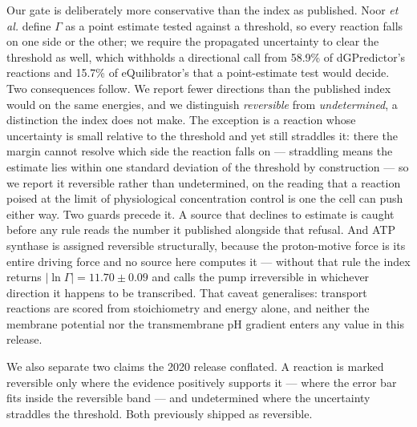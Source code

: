 Our gate is deliberately more conservative than the index as published. Noor
\textit{et al.} define $\Gamma$ as a point estimate tested against a threshold,
so every reaction falls on one side or the other; we require the propagated
uncertainty to clear the threshold as well, which withholds a directional call
from 58.9\% of dGPredictor's reactions and 15.7\% of eQuilibrator's that a
point-estimate test would decide. Two consequences follow. We report fewer
directions than the published index would on the same energies, and we
distinguish \emph{reversible} from \emph{undetermined}, a distinction the index
does not make. The exception is a reaction whose uncertainty is small relative
to the threshold and yet still straddles it: there the margin cannot resolve
which side the reaction falls on --- straddling means the estimate lies within
one standard deviation of the threshold by construction --- so we report it
reversible rather than undetermined, on the reading that a reaction poised at
the limit of physiological concentration control is one the cell can push either
way. Two guards precede it. A source that
declines to estimate is caught before any rule reads the number it published
alongside that refusal. And ATP synthase is assigned reversible structurally,
because the proton-motive force is its entire driving force and no source here
computes it --- without that rule the index returns $|\ln\Gamma| = 11.70 \pm
0.09$ and calls the pump irreversible in whichever direction it happens to be
transcribed. That caveat generalises: transport reactions are scored from
stoichiometry and energy alone, and neither the membrane potential nor the
transmembrane pH gradient enters any value in this release.

We also separate two claims the 2020 release conflated. A reaction is marked
reversible only where the evidence positively supports it --- where the error
bar fits inside the reversible band --- and undetermined where the uncertainty
straddles the threshold. Both previously shipped as reversible.
